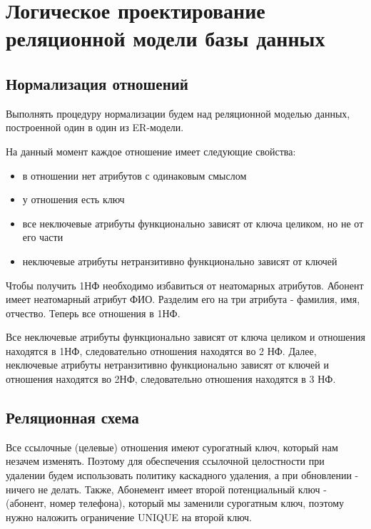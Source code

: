 \documentclass{report}
\begin{document}
\chapter{Логическое проектирование реляционной модели базы данных}

\section{Нормализация отношений}

Выполнять процедуру нормализации будем над реляционной моделью 
данных, построенной один в один из ER-модели. 

На данный момент 
каждое отношение имеет следующие свойства:
\begin{itemize}
    \item в отношении нет атрибутов с одинаковым смыслом
    \item у отношения есть ключ
    \item все неключевые атрибуты функционально зависят от ключа целиком, но не от его части
    \item неключевые атрибуты нетранзитивно функционально зависят от ключей
\end{itemize} 
Чтобы получить 1НФ необходимо избавиться от неатомарных атрибутов. 
Абонент имеет неатомарный атрибут ФИО. Разделим его на три атрибута - 
фамилия, имя, отчество. Теперь все отношения в 1НФ.

Все неключевые атрибуты функционально зависят от ключа целиком и отношения
находятся в 1НФ, следовательно отношения находятся во 2 НФ. Далее, неключевые 
атрибуты нетранзитивно функционально зависят от ключей и отношения находятся
во 2НФ, следовательно отношения находятся в 3 НФ.

\section{Реляционная схема}

Все ссылочные (целевые) отношения имеют сурогатный ключ, который
нам незачем изменять. Поэтому для обеспечения ссылочной целостности
при удалении будем использовать политику каскадного удаления, 
а при обновлении - ничего не делать. Также, Абонемент имеет второй
потенциальный ключ - (абонент, номер телефона), который мы заменили 
сурогатным ключ, поэтому нужно наложить ограничение UNIQUE на второй ключ.
\end{document}

